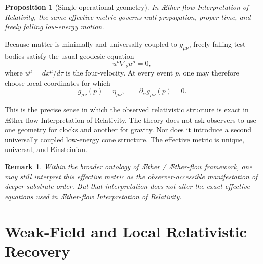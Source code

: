 \documentclass[11pt]{article}
\newcommand{\Aether}{\AE{}ther}
\newcommand{\Aflow}{\AE{}ther-flow}
\newcommand{\TheoryName}{\Aflow{} Interpretation of Relativity}
\newcommand{\TheoryProgram}{\Aether{} / \Aflow{} framework}
\newtheorem{proposition}{Proposition}
\newtheorem{remark}{Remark}
\begin{document}
\begin{proposition}[Single operational geometry]
In \TheoryName{}, the same effective metric governs null propagation, proper time, and freely falling low-energy motion.
\end{proposition}

Because matter is minimally and universally coupled to \(g_{\mu\nu}\), freely falling test bodies satisfy the usual geodesic equation
\begin{equation}
u^\nu \nabla_\nu u^\mu = 0,
\label{eq:geodesic}
\end{equation}
where \(u^\mu = dx^\mu/d\tau\) is the four-velocity. At every event \(p\), one may therefore choose local coordinates for which
\begin{equation}
g_{\mu\nu}(p)=\eta_{\mu\nu},
\qquad
\partial_\alpha g_{\mu\nu}(p)=0.
\label{eq:localinertial}
\end{equation}

This is the precise sense in which the observed relativistic structure is exact in \TheoryName{}. The theory does not ask observers to use one geometry for clocks and another for gravity. Nor does it introduce a second universally coupled low-energy cone structure. The effective metric is unique, universal, and Einsteinian.

\begin{remark}
Within the broader ontology of \TheoryProgram{}, one may still interpret this effective metric as the observer-accessible manifestation of deeper substrate order. But that interpretation does not alter the exact effective equations used in \TheoryName{}.
\end{remark}

\section{Weak-Field and Local Relativistic Recovery}
\end{document}
